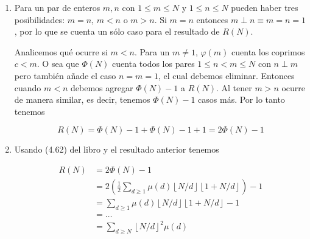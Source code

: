\documentclass{article}
\newcommand{\piso}[1]{\left \lfloor #1 \right \rfloor}
\begin{document}
\renewcommand{\labelenumi}{(\alph{enumi})}
\begin{enumerate}

\item Para un par de enteros $m,n$ con $1 \leq m \leq N$ y $1 \leq n \leq N$
pueden haber tres posibilidades: $m=n$, $m<n$ o $m>n$. Si $m=n$ entonces
$m \perp n \equiv m=n=1$, por lo que se cuenta un sólo caso para el resultado de
$R(N)$.

Analicemos qué ocurre si $m<n$. Para un $m \neq 1$, $\varphi(m)$ cuenta
los coprimos $c < m$. O sea que $\Phi(N)$ cuenta todos los pares $1 \leq n < m
\leq N$ con $n \perp m$ pero también añade el caso $n=m=1$, el cual debemos
eliminar. Entonces cuando $m<n$ debemos agregar $\Phi(N)-1$ a $R(N)$.
Al tener $m>n$ ocurre de manera similar, es decir, tenemos $\Phi(N)-1$ casos
más. Por lo tanto tenemos

\[
R(N) = \Phi(N)-1 + \Phi(N)-1 + 1 = 2\Phi(N) - 1
\]

\item Usando (4.62) del libro y el resultado anterior tenemos

\begin{align*}
R(N)
  & = 2\Phi(N)-1 \\
  & = 2 \left( \frac{1}{2} \sum_{d \geq 1} \mu(d) \piso{N/d} \piso{1+N/d} \right) -1 \\
  & = \sum_{d \geq 1} \mu(d) \piso{N/d} \piso{1+N/d} - 1 \\
  & = \ldots \\
  & = \sum_{d \geq N} \piso{N/d}^2 \mu(d)  \\
\end{align*}

\end{enumerate}

\section{}
\end{document}

